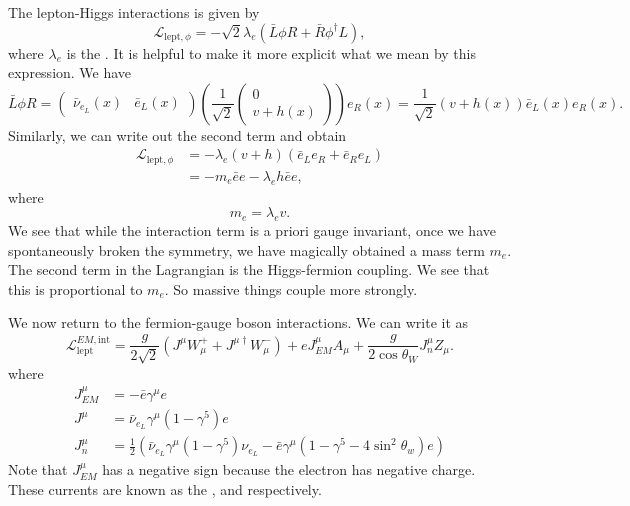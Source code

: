 \documentclass[a4paper]{article}
\begin{document}
The lepton-Higgs interactions is given by
\[
  \mathcal{L}_{\mathrm{lept}, \phi} = - \sqrt{2} \lambda_e (\bar L \phi R + \bar R \phi^\dagger L),
\]
where $\lambda_e$ is the . It is helpful to make it more explicit what we mean by this expression. We have
\[
  \bar{L} \phi R =
  \begin{pmatrix}
    \bar{\nu}_{e_L}(x) & \bar{e}_L(x)
  \end{pmatrix}
  \left(
  \frac{1}{\sqrt{2}}
  \begin{pmatrix}
    0\\
    v + h(x)
  \end{pmatrix}
  \right)
  e_R(x) = \frac{1}{\sqrt{2}} (v + h(x)) \bar{e}_L(x) e_R(x).
\]
Similarly, we can write out the second term and obtain
\begin{align*}
  \mathcal{L}_{\mathrm{lept}, \phi} &= - \lambda_e (v + h) (\bar{e}_L e_R + \bar{e}_R e_L)\\
  &= - m_e \bar{e} e - \lambda_e h \bar{e} e,
\end{align*}
where
\[
  m_e = \lambda_e v.
\]
We see that while the interaction term is a priori gauge invariant, once we have spontaneously broken the symmetry, we have magically obtained a mass term $m_e$. The second term in the Lagrangian is the Higgs-fermion coupling. We see that this is proportional to $m_e$. So massive things couple more strongly.

We now return to the fermion-gauge boson interactions. We can write it as
\[
  \mathcal{L}_{\mathrm{lept}}^{EM, \mathrm{int}} = \frac{g}{2\sqrt{2}} (J^\mu W_\mu^+ + J^{\mu\dagger} W_\mu^-) + e J_{EM}^\mu A_\mu + \frac{g}{2 \cos \theta_W} J_n^\mu Z_\mu.
\]
where
\begin{align*}
  J^\mu_{EM} &= - \bar{e} \gamma^\mu e\\
  J^\mu &= \bar{\nu}_{e_L}\gamma^\mu (1 - \gamma^5) e\\
  J^\mu_n &= \frac{1}{2} \left(\bar{\nu}_{e_L} \gamma^\mu (1 - \gamma^5) \nu_{e_L} - \bar{e} \gamma^\mu (1 - \gamma^5 - 4 \sin^2 \theta_w)e\right)
\end{align*}
Note that $J^\mu_{EM}$ has a negative sign because the electron has negative charge. These currents are known as the ,  and  respectively.
\end{document}
